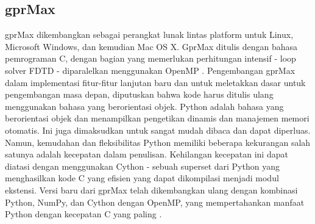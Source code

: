\subsection{gprMax}
gprMax dikembangkan sebagai perangkat lunak lintas platform untuk Linux, Microsoft Windows, dan kemudian Mac OS X. GprMax ditulis dengan bahasa pemrograman C, dengan bagian yang memerlukan perhitungan intensif - loop solver FDTD - diparalelkan menggunakan OpenMP \parencite{Craig2016}. Pengembangan gprMax dalam implementasi fitur-fitur lanjutan baru dan untuk meletakkan dasar untuk pengembangan masa depan, diputuskan bahwa kode harus ditulis ulang menggunakan bahasa yang berorientasi objek. Python adalah bahasa yang berorientasi objek dan menampilkan pengetikan dinamis dan manajemen memori otomatis. Ini juga dimaksudkan untuk sangat mudah dibaca dan dapat diperluas. Namun, kemudahan dan fleksibilitas Python memiliki beberapa kekurangan salah satunya adalah kecepatan dalam penulisan. Kehilangan kecepatan ini dapat diatasi dengan menggunakan Cython - sebuah superset dari Python yang menghasilkan kode C yang efisien yang dapat dikompilasi menjadi modul ekstensi. Versi baru dari gprMax telah dikembangkan ulang dengan kombinasi Python, NumPy, dan Cython dengan OpenMP, yang mempertahankan manfaat Python dengan kecepatan C yang paling \parencite{Craig2015}.

